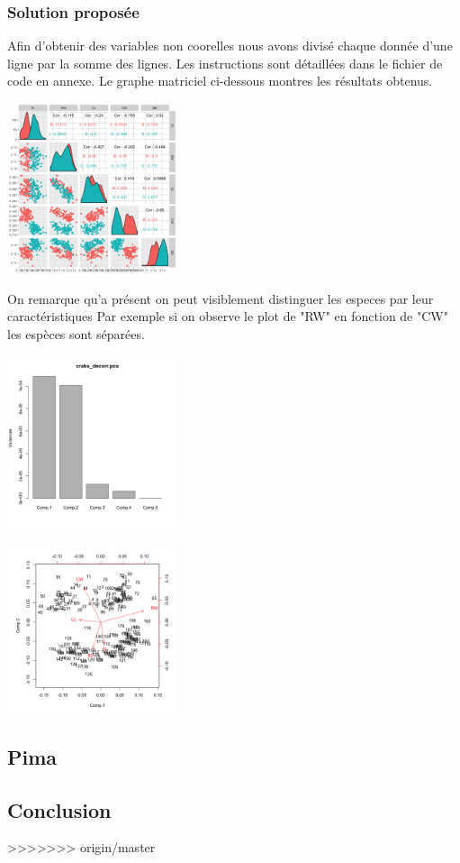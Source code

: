 \documentclass[]{report}
\begin{document}
\subsubsection{Solution proposée}
Afin d'obtenir des variables non coorelles nous avons divisé chaque donnée d'une ligne par la somme des lignes. Les instructions sont détaillées dans le fichier de code en annexe. Le graphe matriciel  ci-dessous montres les résultats obtenus.
\begin{center}
\includegraphics[width=50mm]{Figures/Crabs/matricial_plot_decorr.png}	
\label{fig:crabs_matricial_plot_decorr}
\end{center}
On remarque qu'a présent on peut visiblement distinguer les especes par leur caractéristiques Par exemple si on observe le plot de  "RW" en fonction de "CW" les espèces sont séparées.


	\begin{minipage}{.5\textwidth}
	\centering
	\includegraphics[width=50mm]{Figures/Crabs/decorr_pca_plot.png}
	\label{fig:crabs_pca_plot}
\end{minipage}%
\hspace{0.08\linewidth}
\begin{minipage}{.5\textwidth}
	\centering
	\includegraphics[width=50mm]{Figures/Crabs/decorr_pca_biplot.png}
	\label{fig:crabs_pca_biplot}
\end{minipage}


\subsection{Pima}

\subsection{Conclusion}
>>>>>>> origin/master
\end{document}
